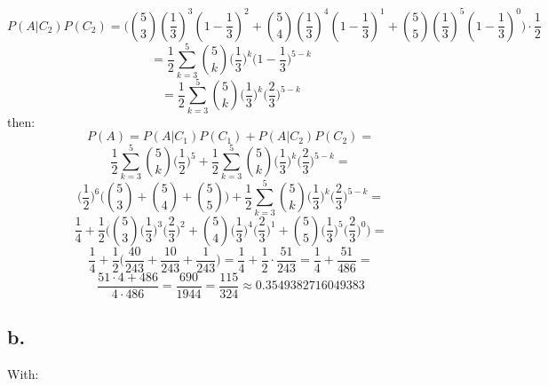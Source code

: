 \documentclass{article}
\begin{document}
\begin{equation*}
    P(A|C_2)P(C_2) = \Bigg(\binom{5}{3}(\frac{1}{3})^{3}(1 - \frac{1}{3})^{2} + \binom{5}{4}(\frac{1}{3})^{4}(1 - \frac{1}{3})^{1} + \binom{5}{5}(\frac{1}{3})^{5}(1 - \frac{1}{3})^{0}\Bigg) \cdot \frac{1}{2}
\end{equation*}
\begin{equation*}
    = \frac{1}{2}\sum_{k=3}^{5} \binom{5}{k}\Big(\frac{1}{3}\Big)^{k}\Big(1 - \frac{1}{3}\Big)^{5-k}
\end{equation*}
\begin{equation*}
    = \frac{1}{2}\sum_{k=3}^{5} \binom{5}{k}\Big(\frac{1}{3}\Big)^{k}\Big(\frac{2}{3}\Big)^{5-k}
\end{equation*}
then:
\begin{equation*}
    P(A) = P(A|C_1)P(C_1) + P(A|C_2)P(C_2) = %
\end{equation*}
\begin{equation*}
    \frac{1}{2}\sum_{k=3}^{5}\binom{5}{k}\Big(\frac{1}{2}\Big)^{5} + \frac{1}{2}\sum_{k=3}^{5} \binom{5}{k}\Big(\frac{1}{3}\Big)^{k}\Big(\frac{2}{3}\Big)^{5-k} =
\end{equation*}
\begin{equation*}
    \Big(\frac{1}{2}\Big)^{6}\Big(\binom{5}{3} + \binom{5}{4} + \binom{5}{5}\Big) + \frac{1}{2}\sum_{k=3}^{5} \binom{5}{k}\Big(\frac{1}{3}\Big)^{k}\Big(\frac{2}{3}\Big)^{5-k} =
\end{equation*}
\begin{equation*}
    \frac{1}{4} + \frac{1}{2}\Bigg( \binom{5}{3}\Big(\frac{1}{3}\Big)^{3}\Big(\frac{2}{3}\Big)^{2} + \binom{5}{4}\Big(\frac{1}{3}\Big)^{4}\Big(\frac{2}{3}\Big)^{1} + \binom{5}{5}\Big(\frac{1}{3}\Big)^{5}\Big(\frac{2}{3}\Big)^{0} \Bigg) = 
\end{equation*}
\begin{equation*}
    \frac{1}{4} + \frac{1}{2}\Bigg( \frac{40}{243} +  \frac{10}{243} + \frac{1}{243}\Bigg) = \frac{1}{4} + \frac{1}{2} \cdot \frac{51}{243} = \frac{1}{4} + \frac{51}{486} = 
\end{equation*}
\begin{equation*}
    \frac{51 \cdot 4 + 486}{4 \cdot 486} = \frac{690}{1944} = \frac{115}{324} \approx 0.3549382716049383
\end{equation*}
\subsection*{b.}

With:
\end{document}
